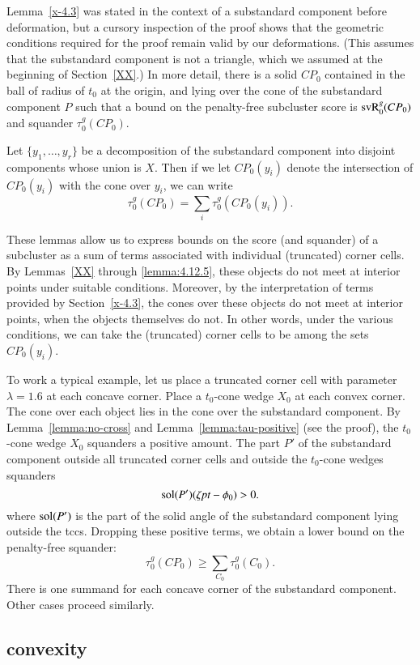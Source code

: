 Lemma~\ref{x-4.3} was stated in the context of a substandard component before
deformation, but a cursory inspection of the proof shows that the
geometric conditions required for the proof remain valid by our
deformations. (This assumes that the substandard component is not a triangle, which
we assumed at the beginning of Section~\ref{XX}.) In more detail,
there is a solid $CP_0$ contained in the ball of radius of $t_0$ at the
origin, and lying over the cone of the substandard component $P$ such that a bound
on the penalty-free subcluster score is 
${\operatorname{svR}}^g_0(CP_0)$ and squander $\tau^g_0(CP_0)$.

Let $\{y_1,\ldots,y_r\}$ be a decomposition of the substandard component into
disjoint components whose union is $X$. Then if we let $CP_0(y_i)$ denote
the intersection of $CP_0(y_i)$ with the cone over $y_i$, we can write
    $$\tau^g_0(CP_0) =\sum_i \tau^g_0(CP_0(y_i)).$$

These lemmas allow us to express bounds on the score (and
squander) of a subcluster as a sum of terms associated with
individual (truncated) corner cells. By Lemmas~\ref{XX} %
through \ref{lemma:4.12.5}, these objects do not meet at interior
points under suitable conditions. Moreover, by the interpretation
of terms provided by Section~\ref{x-4.3}, the cones over these
objects do not meet at interior points, when the objects
themselves do not. In other words, under the various conditions,
we can take the (truncated) corner cells to be among the sets
$CP_0(y_i)$.

To work a typical example, let us place a truncated corner cell with
parameter $\lambda=1.6$ at each concave corner.  Place a $t_0$-cone
wedge $X_0$ at each convex corner. The cone over each object lies in the
cone over the substandard component. By Lemma~\ref{lemma:no-cross} and
Lemma~\ref{lemma:tau-positive} (see the proof), the $t_0$-cone wedge
$X_0$ squanders a positive amount.  The part $P'$ of the substandard component
outside all truncated corner cells and outside the $t_0$-cone wedges
squanders
    $$\operatorname{sol}(P')(\zeta\hbox{\it pt}-\phi_0) > 0.$$
where $\operatorname{sol}(P')$ is the part of the solid angle of the substandard component
lying outside the tccs. Dropping these positive terms, we obtain a
lower bound on the penalty-free squander:
    $$\tau^g_0(CP_0) \ge \sum_{C_0} \tau^g_0(C_0).$$
There is one summand for each concave corner of the substandard component.
Other cases proceed similarly.


\subsection{convexity} %

